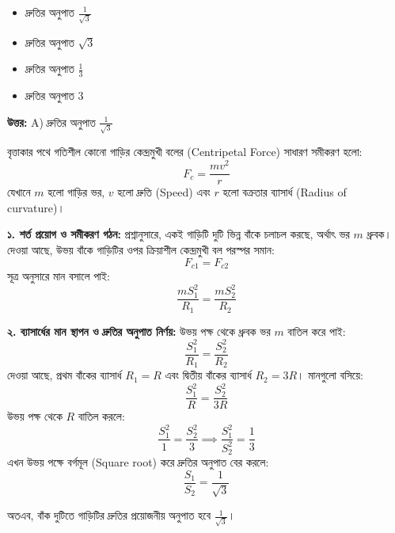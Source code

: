 \documentclass[12pt, a4paper]{article}
\begin{document}
\vspace{1em}

\begin{itemize}[label={}, leftmargin=1cm, itemsep=0.5em]
\item[\textbf{A)}] দ্রুতির অনুপাত $\frac{1}{\sqrt{3}}$
\item[\textbf{B)}] দ্রুতির অনুপাত $\sqrt{3}$
\item[\textbf{C)}] দ্রুতির অনুপাত $\frac{1}{3}$
\item[\textbf{D)}] দ্রুতির অনুপাত $3$
\end{itemize}

\vspace{0.5em}
\begin{tcolorbox}[answerbox]
\textbf{\color{success} উত্তর:} A) দ্রুতির অনুপাত $\frac{1}{\sqrt{3}}$
\end{tcolorbox}
\vspace{1em}

\begin{tcolorbox}[solutionbox={সমাধান (Solution)}]
\noindent
বৃত্তাকার পথে গতিশীল কোনো গাড়ির কেন্দ্রমুখী বলের (Centripetal Force) সাধারণ সমীকরণ হলো:
$$F_c = \frac{m v^2}{r}$$
যেখানে $m$ হলো গাড়ির ভর, $v$ হলো দ্রুতি (Speed) এবং $r$ হলো বক্রতার ব্যাসার্ধ (Radius of curvature)।

\vspace{0.5em}
\textbf{১. শর্ত প্রয়োগ ও সমীকরণ গঠন:}
প্রশ্নানুসারে, একই গাড়িটি দুটি ভিন্ন বাঁকে চলাচল করছে, অর্থাৎ ভর $m$ ধ্রুবক। 
দেওয়া আছে, উভয় বাঁকে গাড়িটির ওপর ক্রিয়াশীল কেন্দ্রমুখী বল পরস্পর সমান:
$$F_{c1} = F_{c2}$$
সূত্র অনুসারে মান বসালে পাই:
$$\frac{m S_1^2}{R_1} = \frac{m S_2^2}{R_2}$$

\vspace{0.5em}
\textbf{২. ব্যাসার্ধের মান স্থাপন ও দ্রুতির অনুপাত নির্ণয়:}
উভয় পক্ষ থেকে ধ্রুবক ভর $m$ বাতিল করে পাই:
$$\frac{S_1^2}{R_1} = \frac{S_2^2}{R_2}$$
দেওয়া আছে, প্রথম বাঁকের ব্যাসার্ধ $R_1 = R$ এবং দ্বিতীয় বাঁকের ব্যাসার্ধ $R_2 = 3R$। মানগুলো বসিয়ে:
$$\frac{S_1^2}{R} = \frac{S_2^2}{3R}$$
উভয় পক্ষ থেকে $R$ বাতিল করলে:
$$\frac{S_1^2}{1} = \frac{S_2^2}{3} \implies \frac{S_1^2}{S_2^2} = \frac{1}{3}$$
এখন উভয় পক্ষে বর্গমূল (Square root) করে দ্রুতির অনুপাত বের করলে:
$$\frac{S_1}{S_2} = \frac{1}{\sqrt{3}}$$

অতএব, বাঁক দুটিতে গাড়িটির দ্রুতির প্রয়োজনীয় অনুপাত হবে $\frac{1}{\sqrt{3}}$।
\end{tcolorbox}
\vspace{1em}
\end{document}
